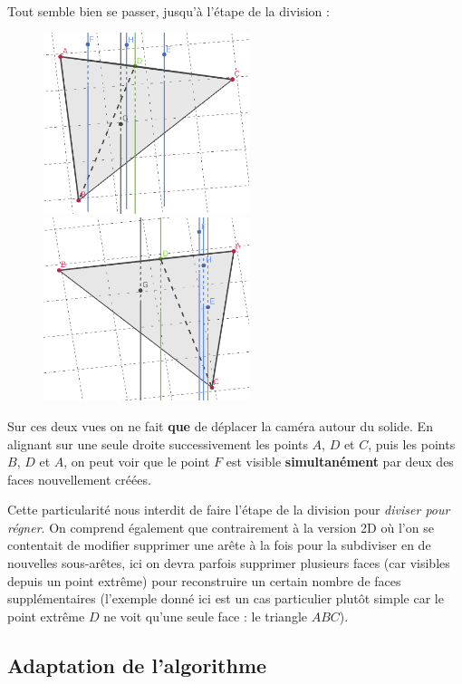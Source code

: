 \documentclass[]{article}
\begin{document}
\paragraph{}
Tout semble bien se passer, jusqu'à l'étape de la division :

\begin{figure}[H]
	\includegraphics[width=6cm]{qh3d/geogebra-export6.png}
	\includegraphics[width=6cm]{qh3d/geogebra-export7.png}
\end{figure}

Sur ces deux vues on ne fait \textbf{que} de déplacer la caméra autour du solide.
En alignant sur une seule droite successivement les points $A$, $D$ et $C$, puis les points $B$, $D$ et $A$, on peut voir que le point $F$ est visible \textbf{simultanément} par deux des faces nouvellement créées.

Cette particularité nous interdit de faire l'étape de la division pour \emph{diviser pour régner}. On comprend également que contrairement à la version 2D où l'on se contentait de modifier supprimer une arête à la fois pour la subdiviser en de nouvelles sous-arêtes, ici on devra parfois supprimer plusieurs faces (car visibles depuis un point extrême) pour reconstruire un certain nombre de faces supplémentaires (l'exemple donné ici est un cas particulier plutôt simple car le point extrême $D$ ne voit qu'une seule face : le triangle $ABC$).

\subsection{Adaptation de l'algorithme}
\end{document}

